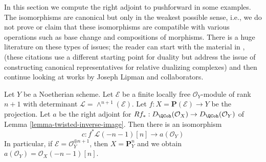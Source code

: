 \noindent
In this section we compute the right adjoint to pushforward in
some examples. The isomorphisms are canonical but only in the weakest
possible sense, i.e., we do not prove or claim that these isomorphisms are
compatible with various operations such as base change and compositions
of morphisms. There is a huge literature on these types of issues; the reader
can start with the material in \cite{RD}, \cite{Conrad-GD}
(these citations use a different starting point for duality but address the
issue of constructing canonical representatives for relative dualizing
complexes) and then continue looking at works by
Joseph Lipman and collaborators.

\begin{lemma}
\label{lemma-upper-shriek-P1}
Let $Y$ be a Noetherian scheme. Let $\mathcal{E}$ be a finite locally
free $\mathcal{O}_Y$-module of rank $n + 1$ with determinant
$\mathcal{L} = \wedge^{n + 1}(\mathcal{E})$.
Let $f : X = \mathbf{P}(\mathcal{E}) \to Y$ be the projection.
Let $a$ be the right adjoint for
$Rf_* : D_\QCoh(\mathcal{O}_X) \to D_\QCoh(\mathcal{O}_Y)$ of
Lemma \ref{lemma-twisted-inverse-image}.
Then there is an isomorphism
$$
c : f^*\mathcal{L}(-n - 1)[n] \longrightarrow a(\mathcal{O}_Y)
$$
In particular, if $\mathcal{E} = \mathcal{O}_Y^{\oplus n + 1}$, then
$X = \mathbf{P}^n_Y$ and we obtain
$a(\mathcal{O}_Y) = \mathcal{O}_X(-n - 1)[n]$.
\end{lemma}

